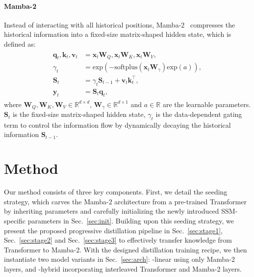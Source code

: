 \paragraph{Mamba-2}
Instead of interacting with all historical positions, Mamba-2~\cite{Mamba-2} compresses the historical information into a fixed-size matrix-shaped hidden state, which is defined as:
\begin{align}
\begin{split}
    \boldsymbol{q}_t, \boldsymbol{k}_t, \boldsymbol{v}_t &= \boldsymbol{x}_t \boldsymbol{W}_Q, \boldsymbol{x}_t \boldsymbol{W}_K, \boldsymbol{x}_t \boldsymbol{W}_V, \\
    \gamma_t &= \text{exp}\left(-\text{softplus}(\boldsymbol{x}_t\boldsymbol{W}_\gamma)\text{exp}(a)\right), \\
    \mathbf{S}_t &= \gamma_t \mathbf{S}_{t-1} + \boldsymbol{v}_t \boldsymbol{k}_t^\top, \\
    \boldsymbol{y}_t &= \mathbf{S}_t \boldsymbol{q}_t,
    \label{eq:Mamba-2}
\end{split}
\end{align}
where $\boldsymbol{W}_Q, \boldsymbol{W}_K, \boldsymbol{W}_V \in \mathbb{R}^{d \times d}$, $\boldsymbol{W}_\gamma \in \mathbb{R}^{d \times 1}$ and $a \in \mathbb{R}$ are the learnable parameters. $\mathbf{S}_t$ is the fixed-size matrix-shaped hidden state, $\gamma_t$ is the data-dependent gating term to control the information flow by dynamically decaying the historical information $\mathbf{S}_{t-1}$.

\section{Method}
Our method consists of three key components. 
First, we detail the seeding strategy, which carves the Mamba-2 architecture from a pre-trained Transformer by inheriting parameters and carefully initializing the newly introduced SSM-specific parameters in Sec.~\ref{sec:init}. 
Building upon this seeding strategy, we present the proposed progressive distillation pipeline in Sec.~\ref{sec:stage1}, Sec.~\ref{sec:stage2} and Sec.~\ref{sec:stage3} to effectively transfer knowledge from Transformer to Mamba-2. 
With the designed distillation training recipe, we then instantiate two model variants in Sec.~\ref{sec:arch}: \name{}-linear using only Mamba-2 layers, and \name{}-hybrid incorporating interleaved Transformer and Mamba-2 layers.

